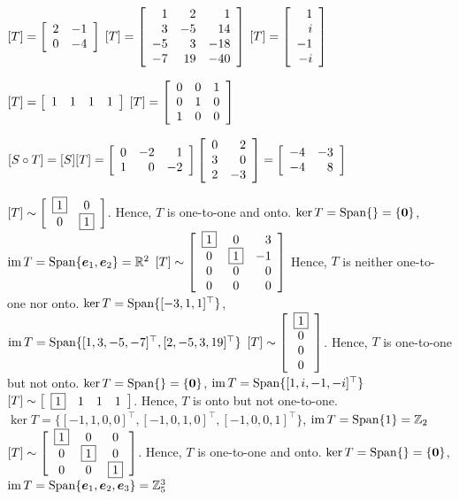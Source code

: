 
\begin{enumerate}[!HW!, start=1]
\begin{multicols}{3}
\itemspade $[T] =\mtx{rr}{2&-1\\0&-4}$
\itemspade $[T] =\mtx{rrr}{1&2&1\\3&-5&14\\-5&3&-18\\-7&19&-40}$
\itemspade $[T] = \mtx{r}{1\\i\\-1\\-i}$
\end{multicols}
\begin{multicols}{2}
\itemspade $[T] = \mtx{rrrr}{1&1&1&1}$
\itemspade  $[T] = \mtx{rrr}{0&0&1\\0&1&0\\1&0&0}$
\end{multicols}

\itemspade $[S\circ T] = [S][T] = \mtx{rrr}{0&-2&1\\1&0&-2}\mtx{rr}{0&2\\3&0\\2&-3}=\mtx{rr}{-4&-3\\-4&8}$ %

\itemspade $[T] \sim \mtx{cc}{\fbox{$1$}&0\\0&\fbox{$1$}}$. Hence, $T$ is one-to-one and onto. $\ker T = \Span\{\} =  \{\bb 0\}$, $\im T = \Span\{\bb e_1, \bb e_2\} = \R^2$
\itemspade $[T] \sim\mtx{ccr}{\fbox{$1$}&0&3\\0&\fbox{$1$}&-1\\0&0&0\\0&0&0}$ Hence, $T$ is neither one-to-one nor onto. $\ker T = \Span\{[-3,1,1]^\top \}$, $\im T = \Span\{[1,3,-5,-7]^\top , [2,-5,3,19]^\top \}$
\itemspade $[T] \sim \mtx{c}{\fbox{$1$}\\0\\0\\0}$. Hence, $T$ is one-to-one but not onto. $\ker T = \Span\{\}= \{\bb 0\}$, $\im T = \Span\{[1, i, -1, -i]^\top \}$
\itemspade $[T] \sim \mtx{rrrr}{\fbox{$1$}&1&1&1}$. Hence, $T$ is onto but not one-to-one. $\ker T = \{[-1,1,0,0]^\top , [-1,0,1,0]^\top ,[-1,0,0,1]^\top \}$, $\im T = \Span\{1\} = \Z_2$
\itemspade  $[T] \sim \mtx{ccc}{\fbox{$1$}&0&0\\0&\fbox{$1$}&0\\0&0&\fbox{$1$}}$. Hence, $T$ is one-to-one and onto. $\ker T = \Span\{\} = \{\bb 0\}$, $\im T = \Span\{\bb e_1, \bb e_2, \bb e_3\} = \Z_5^3$


\end{enumerate}

